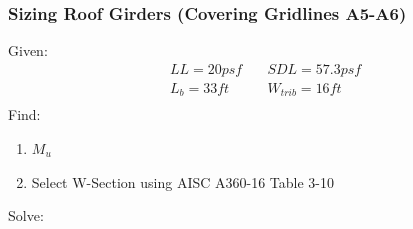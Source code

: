 \documentclass{report} %
\begin{document}
\subsubsection*{Sizing Roof Girders (Covering Gridlines A5-A6)}
Given:
\begin{equation*}
    \begin{aligned}
        &LL = 20psf \quad &SDL = 57.3psf \\
        &L_b = 33ft \quad &W_{trib} = 16ft \\
    \end{aligned}
\end{equation*}
Find:
\begin{enumerate}
    \item $M_u$
    \item Select W-Section using AISC A360-16 Table 3-10
\end{enumerate}
Solve:
\end{document}
